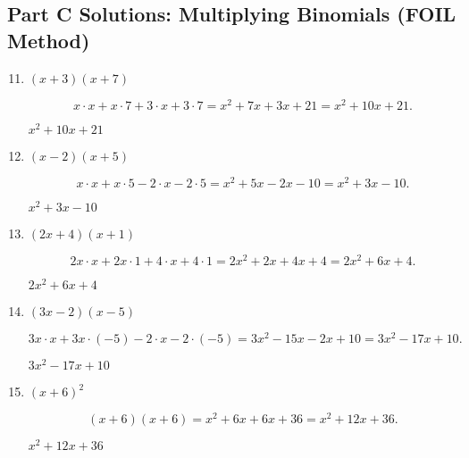\documentclass[12pt]{article}
\begin{document}
\subsection*{Part C Solutions: Multiplying Binomials (FOIL Method)}
\begin{enumerate}
  \setcounter{enumi}{10}
  \item \((x + 3)(x + 7)\)

  \[
  x\cdot x + x \cdot 7 + 3 \cdot x + 3 \cdot 7
  = x^2 + 7x + 3x + 21
  = x^2 + 10x + 21.
  \]

  \(\boxed{x^2 + 10x + 21}\)

  \item \((x - 2)(x + 5)\)

  \[
  x \cdot x + x \cdot 5 - 2 \cdot x - 2 \cdot 5
  = x^2 + 5x - 2x - 10
  = x^2 + 3x - 10.
  \]

  \(\boxed{x^2 + 3x - 10}\)

  \item \((2x + 4)(x + 1)\)

  \[
  2x \cdot x + 2x \cdot 1 + 4 \cdot x + 4 \cdot 1
  = 2x^2 + 2x + 4x + 4
  = 2x^2 + 6x + 4.
  \]

  \(\boxed{2x^2 + 6x + 4}\)

  \item \((3x - 2)(x - 5)\)

  \[
  3x \cdot x + 3x \cdot (-5) - 2 \cdot x - 2 \cdot (-5)
  = 3x^2 - 15x - 2x + 10
  = 3x^2 - 17x + 10.
  \]

  \(\boxed{3x^2 - 17x + 10}\)

  \item \((x + 6)^2\)

  \[
  (x + 6)(x + 6)
  = x^2 + 6x + 6x + 36
  = x^2 + 12x + 36.
  \]

  \(\boxed{x^2 + 12x + 36}\)
\end{enumerate}
\end{document}
